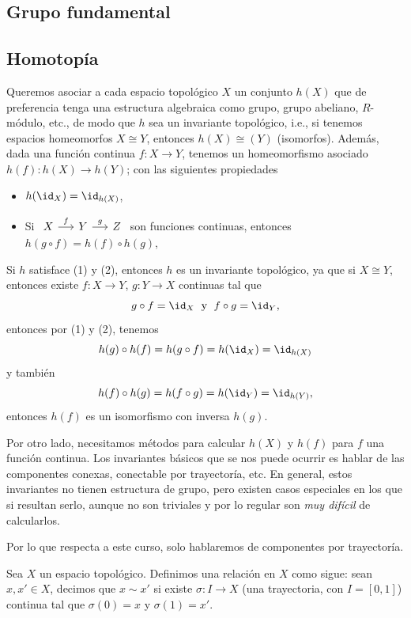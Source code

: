 \begin{center}
    \section{Grupo fundamental}
\end{center}
\subsection{Homotopía}


Queremos asociar a cada espacio topológico $X$ un conjunto $h(X)$ que de preferencia tenga una estructura algebraica como grupo, grupo abeliano, $R$-módulo, etc., de modo que $h$ sea un invariante topológico, i.e., si tenemos espacios homeomorfos $X\cong Y$, entonces $h(X)\cong (Y)$ (isomorfos). Además, dada una función continua $f:X\to Y$, tenemos un homeomorfismo asociado $h(f):h(X)\to h(Y)$; con las siguientes propiedades
\begin{itemize}
    \item[(1)] $h(\id_X)=\id_{h(X)}$,
    \item[(2)] Si $\begin{tikzcd}[column sep=0.5cm,row sep=1.25cm]  
                    X \ar[r,"f"] & Y \ar[r,"g"] & Z
                \end{tikzcd}$
            son funciones continuas, entonces $h(g\circ f)=h(f)\circ h(g)$,
\end{itemize}
\begin{nota}
    Si $h$ satisface (1) y (2), entonces $h$ es un invariante topológico, ya que si $X\cong Y$, entonces existe $f:X\to Y$, $g:Y\to X$ continuas tal que
    \[
    g\circ f=\id_X\;\text{ y }\; f\circ g=\id_Y,
    \]
    entonces por (1) y (2), tenemos
    \begin{equation*}
        h(g)\circ h(f)=h(g\circ f)=h(\id_X)=\id_{h(X)}
    \end{equation*}
    y también 
    \begin{equation*}
        h(f)\circ h(g)=h(f\circ g)=h(\id_Y)=\id_{h(Y)},
    \end{equation*}
    entonces $h(f)$ es un isomorfismo con inversa $h(g)$.

    Por otro lado, necesitamos métodos para calcular $h(X)$ y $h(f)$ para $f$ una función continua. Los invariantes básicos que se nos puede ocurrir es hablar de las componentes conexas, conectable por trayectoría, etc. En general, estos invariantes no tienen estructura de grupo, pero existen casos especiales en los que si resultan serlo, aunque no son triviales y por lo regular son \textit{muy difícil} de calcularlos.

    Por lo que respecta a este curso, solo hablaremos de componentes por trayectoría.
\end{nota}
\begin{definicion}
\label{rel:homo}
    Sea $X$ un espacio topológico. Definimos una relación en $X$ como sigue: sean $x,x'\in X$, decimos que $x\sim x'$ si existe $\sigma:I\to X$ (una trayectoria, con $I=[0,1]$) continua tal que $\sigma(0)=x$ y $\sigma(1)=x'$.
\end{definicion}

